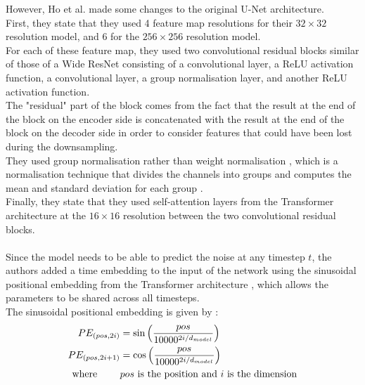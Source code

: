 \documentclass{article}
\begin{document}
However, Ho et al. \cite{ho2020denoising} made some changes to the original U-Net architecture. \\
First, they state that they used 4 feature map resolutions for their $32 \times 32$ resolution model, and 6 for the $256 \times 256$ resolution model. \\
For each of these feature map, they used two convolutional residual blocks similar of those of a Wide ResNet \cite{zagoruyko2017wide} consisting of a convolutional layer, a ReLU activation function, a convolutional layer, a group normalisation layer, and another ReLU activation function. \\ The "residual" part of the block comes from the fact that the result at the end of the block on the encoder side is concatenated with the result at the end of the block on the decoder side in order to consider features that could have been lost during the downsampling. \cite{lai2022rethinking} \\
They used group normalisation \cite{wu2018group} rather than weight normalisation \cite{salimans2016weight}, which is a normalisation technique that divides the channels into groups and computes the mean and standard deviation for each group \cite{ho2020denoising}. \\
Finally, they state that they used self-attention layers from the Transformer architecture \cite{vaswani2023attention} at the $16 \times 16$ resolution between the two convolutional residual blocks. \cite{ho2020denoising}
\\\\
Since the model needs to be able to predict the noise at any timestep $t$, the authors added a time embedding to the input of the network using the sinusoidal positional embedding from the Transformer architecture \cite{vaswani2023attention}, which allows the parameters to be shared across all timesteps. \\
The sinusoidal positional embedding is given by \cite{vaswani2023attention}:
\begin{align}
  PE_{(pos, 2i)} &= \sin \left( \frac{pos}{10000^{2i/d_{model}}} \right) \\
  PE_{(pos, 2i+1)} &= \cos \left( \frac{pos}{10000^{2i/d_{model}}} \right) \\
  \text{where } \qquad & pos \text{ is the position and } i \text{ is the dimension} \notag
\end{align}
\end{document}

